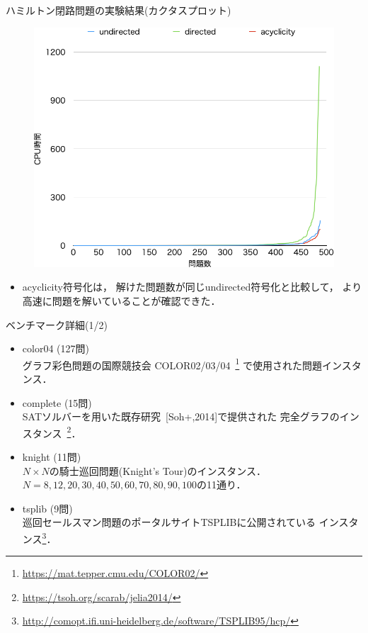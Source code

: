 \documentclass[dvipdfmx]{beamer}
\begin{document}
\begin{frame}[noframenumbering]{ハミルトン閉路問題の実験結果(カクタスプロット)}
\begin{figure}[tb]
\begin{center}
  \includegraphics[width=0.7\linewidth]{fig/cactus_old.png}
\label{cactus}
\end{center}
\end{figure}

\begin{itemize}
\item \textsf{acyclicity}符号化は，
  解けた問題数が同じ\textsf{undirected}符号化と比較して，
  より高速に問題を解いていることが確認できた．
\end{itemize}
\end{frame}
\begin{frame}[noframenumbering]{ベンチマーク詳細(1/2)}
\begin{itemize}
\item \textsf{color04} (127問)\\
  グラフ彩色問題の国際競技会
  COLOR02/03/04~\footnote{\url{https://mat.tepper.cmu.edu/COLOR02/}}
  で使用された問題インスタンス．
\item \textsf{complete} (15問)\\
  SATソルバーを用いた既存研究~{\scriptsize[Soh+,2014]}で提供された
  完全グラフのインスタンス~\footnote{\url{https://tsoh.org/scarab/jelia2014/}}．
\item \textsf{knight} (11問)\\
  $N\times N$の騎士巡回問題(Knight's Tour)のインスタンス．\\
  $N=8,12,20,30,40,50,60,70,80,90,100$の11通り．
\item \textsf{tsplib} (9問)\\
  巡回セールスマン問題のポータルサイトTSPLIBに公開されている
  インスタンス\footnote{\url{http://comopt.ifi.uni-heidelberg.de/software/TSPLIB95/hcp/}}．
\end{itemize}  
\end{frame}
\end{document}

